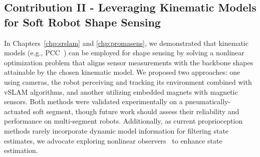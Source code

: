 \subsection{Contribution II - Leveraging Kinematic Models for Soft Robot Shape Sensing}
In Chapters~\ref{chp:srslam} and \ref{chp:promasens}, we demonstrated that kinematic models (e.g., \gls{PCC}~\citep{webster2010design}) can be employed for shape sensing by solving a nonlinear optimization problem that aligns sensor measurements with the backbone shapes attainable by the chosen kinematic model. We proposed two approaches: one using cameras, the robot perceiving and tracking its environment combined with \gls{vSLAM} algorithms, and another utilizing embedded magnets with magnetic sensors. Both methods were validated experimentally on a pneumatically-actuated soft segment, though future work should assess their reliability and performance on multi-segment robots. Additionally, as current proprioception methods rarely incorporate dynamic model information for filtering state estimates, we advocate exploring nonlinear observers~\citep{shao2023model} to enhance state estimation.


